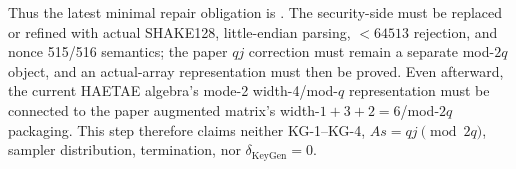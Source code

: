 Thus the latest minimal repair obligation is
. The security-side
 must be replaced or refined with actual
SHAKE128, little-endian parsing, \(<64513\) rejection, and nonce 515/516
semantics; the paper \(qj\) correction must remain a separate mod-\(2q\)
object, and an actual-array representation must then be proved. Even afterward,
the current HAETAE algebra's mode-2 width-4/mod-\(q\) representation must be
connected to the paper augmented matrix's width-\(1+3+2=6\)/mod-\(2q\)
packaging. This step therefore claims neither KG-1--KG-4,
\(As=qj\pmod{2q}\), sampler distribution, termination, nor
\(\delta_{\mathrm{KeyGen}}=0\).
